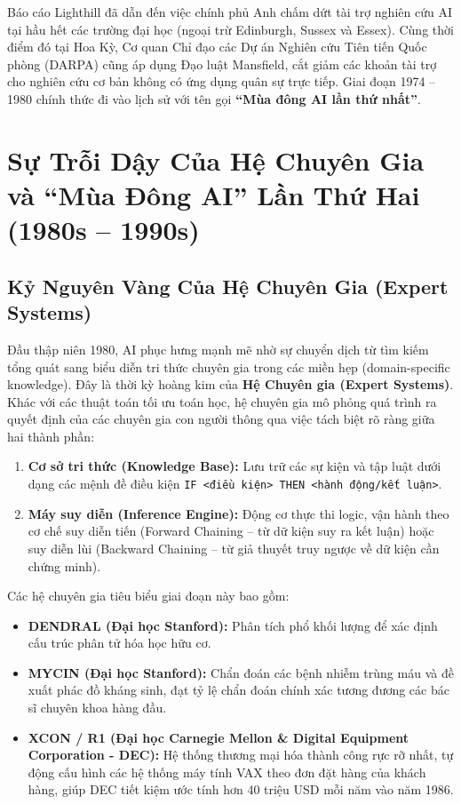 \documentclass[12pt,a4paper]{report}
\begin{document}
Báo cáo Lighthill đã dẫn đến việc chính phủ Anh chấm dứt tài trợ nghiên cứu AI tại hầu hết các trường đại học (ngoại trừ Edinburgh, Sussex và Essex). Cùng thời điểm đó tại Hoa Kỳ, Cơ quan Chỉ đạo các Dự án Nghiên cứu Tiên tiến Quốc phòng (DARPA) cũng áp dụng Đạo luật Mansfield, cắt giảm các khoản tài trợ cho nghiên cứu cơ bản không có ứng dụng quân sự trực tiếp. Giai đoạn 1974 -- 1980 chính thức đi vào lịch sử với tên gọi \textbf{“Mùa đông AI lần thứ nhất”}.

\section{Sự Trỗi Dậy Của Hệ Chuyên Gia và “Mùa Đông AI” Lần Thứ Hai (1980s -- 1990s)}

\subsection{Kỷ Nguyên Vàng Của Hệ Chuyên Gia (Expert Systems)}
Đầu thập niên 1980, AI phục hưng mạnh mẽ nhờ sự chuyển dịch từ tìm kiếm tổng quát sang biểu diễn tri thức chuyên gia trong các miền hẹp (domain-specific knowledge). Đây là thời kỳ hoàng kim của \textbf{Hệ Chuyên gia (Expert Systems)}. Khác với các thuật toán tối ưu toán học, hệ chuyên gia mô phỏng quá trình ra quyết định của các chuyên gia con người thông qua việc tách biệt rõ ràng giữa hai thành phần:
\begin{enumerate}[leftmargin=1.2cm]
    \item \textbf{Cơ sở tri thức (Knowledge Base):} Lưu trữ các sự kiện và tập luật dưới dạng các mệnh đề điều kiện \texttt{IF <điều kiện> THEN <hành động/kết luận>}.
    \item \textbf{Máy suy diễn (Inference Engine):} Động cơ thực thi logic, vận hành theo cơ chế suy diễn tiến (Forward Chaining -- từ dữ kiện suy ra kết luận) hoặc suy diễn lùi (Backward Chaining -- từ giả thuyết truy ngược về dữ kiện cần chứng minh).
\end{enumerate}

Các hệ chuyên gia tiêu biểu giai đoạn này bao gồm:
\begin{itemize}[leftmargin=1.2cm]
    \item \textbf{DENDRAL (Đại học Stanford):} Phân tích phổ khối lượng để xác định cấu trúc phân tử hóa học hữu cơ.
    \item \textbf{MYCIN (Đại học Stanford):} Chẩn đoán các bệnh nhiễm trùng máu và đề xuất phác đồ kháng sinh, đạt tỷ lệ chẩn đoán chính xác tương đương các bác sĩ chuyên khoa hàng đầu.
    \item \textbf{XCON / R1 (Đại học Carnegie Mellon \& Digital Equipment Corporation - DEC):} Hệ thống thương mại hóa thành công rực rỡ nhất, tự động cấu hình các hệ thống máy tính VAX theo đơn đặt hàng của khách hàng, giúp DEC tiết kiệm ước tính hơn 40 triệu USD mỗi năm vào năm 1986.
\end{itemize}
\end{document}

